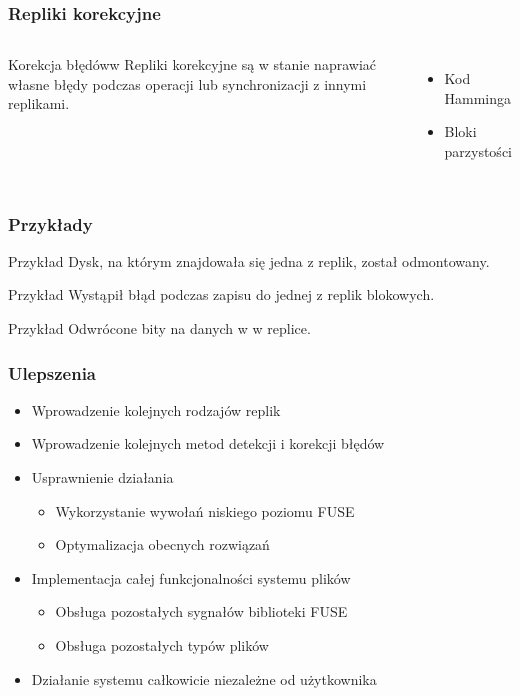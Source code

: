 \documentclass{beamer}
\begin{document}
\begin{frame}
        \frametitle{Repliki korekcyjne }
	\begin{columns}
		\begin{block}{Korekcja błędóww}
		   Repliki korekcyjne są w stanie naprawiać własne błędy podczas operacji lub synchronizacji z innymi replikami.
        \end{block}
		\begin{itemize}
			\item Kod Hamminga 
			\item Bloki parzystości
		\end{itemize}

	\end{columns}
\end{frame}
			
	\begin{frame}
		\frametitle{Przykłady}
		\begin{block}{Przykład}
			Dysk, na którym znajdowała się jedna z replik, został odmontowany. 
		\end{block}
		\pause
		\begin{block}{Przykład}
			Wystąpił błąd podczas zapisu do jednej z replik blokowych.
		\end{block}
		\pause
		\begin{block}{Przykład}
			Odwrócone bity na danych w w replice.
		\end{block}
	\end{frame}
	

	\begin{frame}
		\frametitle{Ulepszenia}
		\begin{itemize}
			\item Wprowadzenie kolejnych rodzajów replik
            \item Wprowadzenie kolejnych metod detekcji i korekcji błędów
			\item Usprawnienie działania
			\begin{itemize}
				\item Wykorzystanie wywołań niskiego poziomu FUSE
				\item Optymalizacja obecnych rozwiązań 
			\end{itemize}
			\item Implementacja całej funkcjonalności systemu plików
                    \begin{itemize}
                        \item Obsługa pozostałych sygnałów biblioteki FUSE
                        \item Obsługa pozostałych typów plików
                    \end{itemize}
			\item Działanie systemu całkowicie niezależne od użytkownika
		\end{itemize}
	\end{frame}
\end{document}
